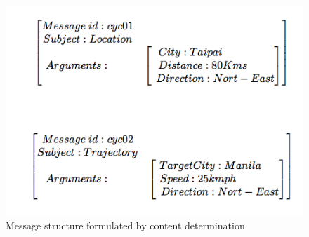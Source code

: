 \documentclass{article}
\begin{document}
%

\begin{figure}
\centering
\includegraphics[scale=0.5]{figures/messageStructure.png}
\caption{Message structure formulated by content determination}
\label{fig:msgStructure}
\end{figure}
\end{document}

